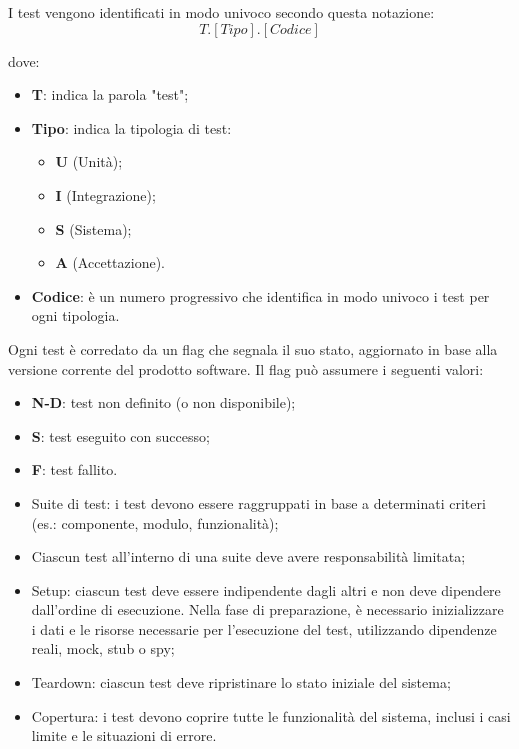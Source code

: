 \par I test vengono identificati in modo univoco secondo questa notazione:
\[T.[Tipo].[Codice]\]
\par dove:
\begin{itemize}
    \item \textbf{T}: indica la parola "test";
    \item \textbf{Tipo}: indica la tipologia di test:
        \begin{itemize}
            \item \textbf{U} (Unità);
            \item \textbf{I} (Integrazione);
            \item \textbf{S} (Sistema);
            \item \textbf{A} (Accettazione).
        \end{itemize}
    \item \textbf{Codice}: è un numero progressivo che identifica in modo univoco i test per ogni tipologia.
\end{itemize}

\par Ogni test è corredato da un flag che segnala il suo stato, aggiornato in base alla versione corrente del prodotto software. Il flag può assumere i seguenti valori:
\begin{itemize}
    \item \textbf{N-D}: test non definito (o non disponibile);
    \item \textbf{S}: test eseguito con successo;
    \item \textbf{F}: test fallito.
\end{itemize}

\begin{itemize}
    \item Suite di test: i test devono essere raggruppati in base a determinati criteri (es.: componente, modulo, funzionalità);
    \item Ciascun test all'interno di una suite deve avere responsabilità limitata;
    \item Setup: ciascun test deve essere indipendente dagli altri e non deve dipendere dall'ordine di esecuzione. Nella fase di preparazione, è necessario inizializzare i dati e le risorse necessarie per l'esecuzione del test, utilizzando dipendenze reali, mock, stub o spy;
    \item Teardown: ciascun test deve ripristinare lo stato iniziale del sistema; 
    \item Copertura: i test devono coprire tutte le funzionalità del sistema, inclusi i casi limite e le situazioni di errore.
\end{itemize}

